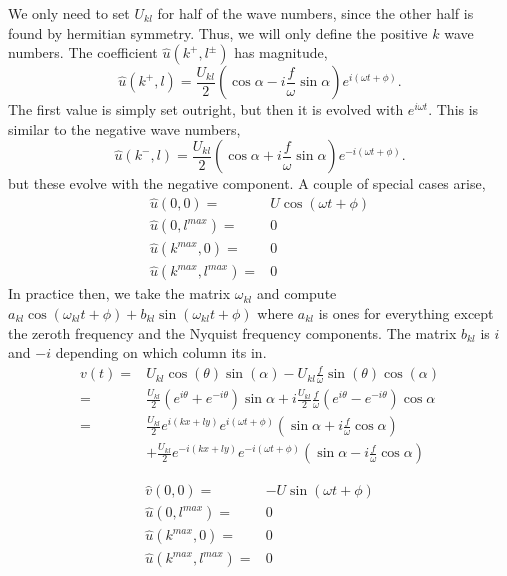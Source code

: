 \documentclass[11pt]{amsart}
\begin{document}
We only need to set $U_{kl}$ for half of the wave numbers, since the other half is found by hermitian symmetry. Thus, we will only define the positive $k$ wave numbers. The coefficient $\hat{u}(k^+,l^\pm)$ has magnitude,
\begin{equation}
\hat{u}(k^+,l) = \frac{U_{kl}}{2} \left( \cos \alpha - i \frac{f}{\omega} \sin \alpha \right) e^{i (\omega t + \phi)}.
\end{equation}
The first value is simply set outright, but then it is evolved with $e^{i \omega t}$. This is similar to the negative wave numbers, 
\begin{equation}
\hat{u}(k^-,l) = \frac{U_{kl}}{2} \left( \cos \alpha + i \frac{f}{\omega} \sin \alpha \right) e^{-i (\omega t + \phi)}.
\end{equation}
but these evolve with the negative component.
A couple of special cases arise,
\begin{align}
\hat{u}(0,0) =& U \cos( \omega t + \phi) \\
\hat{u}(0,l^{max}) =& 0 \\
\hat{u}(k^{max},0) =& 0 \\
\hat{u}(k^{max},l^{max}) = & 0
\end{align}
In practice then, we take the matrix $\omega_{kl}$ and compute $ a_{kl} \cos( \omega_{kl} t + \phi) + b_{kl} \sin( \omega_{kl} t + \phi)$ where $a_{kl}$ is ones for everything except the zeroth frequency and the Nyquist frequency components. The matrix $b_{kl}$ is $i$ and $-i$ depending on which column its in.
\begin{align}
v(t) =& U_{kl} \cos( \theta ) \sin( \alpha) - U_{kl} \frac{f}{\omega} \sin( \theta ) \cos(\alpha) \\
=& \frac{U_{kl}}{2} \left( e^{i\theta} + e^{-i \theta} \right) \sin \alpha + i \frac{U_{kl}}{2} \frac{f}{\omega} \left( e^{i \theta} - e^{-i\theta} \right) \cos \alpha \\
=& \frac{U_{kl}}{2} e^{i(kx+ly)} e^{i(\omega t + \phi)} \left( \sin \alpha + i \frac{f}{\omega} \cos \alpha \right)  \\ \nonumber
&+ \frac{U_{kl}}{2} e^{-i(kx+ly)} e^{-i(\omega t + \phi)} \left( \sin \alpha - i \frac{f}{\omega} \cos \alpha \right) 
\end{align}

\begin{align}
\hat{v}(0,0) =& - U \sin( \omega t + \phi) \\
\hat{u}(0,l^{max}) =& 0 \\
\hat{u}(k^{max},0) =& 0 \\
\hat{u}(k^{max},l^{max}) = & 0
\end{align}
\end{document}
